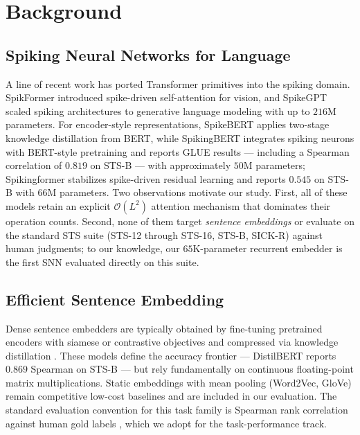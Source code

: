 \documentclass[11pt, conference, compsoc, twoside]{IEEEtran}
\begin{document}
\section{Background}

\subsection{Spiking Neural Networks for Language}
A line of recent work has ported Transformer primitives into the spiking domain. SpikFormer \cite{zhou2023spikformer} introduced spike-driven self-attention for vision, and SpikeGPT \cite{zhu2023spikegpt} scaled spiking architectures to generative language modeling with up to $216$M parameters. For encoder-style representations, SpikeBERT \cite{lv2023spikebert} applies two-stage knowledge distillation from BERT, while SpikingBERT \cite{bal2024spikingbert} integrates spiking neurons with BERT-style pretraining and reports GLUE results --- including a Spearman correlation of $0.819$ on STS-B --- with approximately $50$M parameters; Spikingformer \cite{zhou2025spikingformer} stabilizes spike-driven residual learning and reports $0.545$ on STS-B with $66$M parameters. Two observations motivate our study. First, all of these models retain an explicit $\mathcal{O}(L^2)$ attention mechanism that dominates their operation counts. Second, none of them target \textit{sentence embeddings} or evaluate on the standard STS suite (STS-12 through STS-16, STS-B, SICK-R) against human judgments; to our knowledge, our $65$K-parameter recurrent embedder is the first SNN evaluated directly on this suite.

\subsection{Efficient Sentence Embedding}
Dense sentence embedders are typically obtained by fine-tuning pretrained encoders with siamese \cite{reimers2019sentence} or contrastive \cite{gao2021simcse} objectives and compressed via knowledge distillation \cite{hinton2015distilling, sanh2019distilbert, wang2020minilm}. These models define the accuracy frontier --- DistilBERT reports $0.869$ Spearman on STS-B \cite{sanh2019distilbert} --- but rely fundamentally on continuous floating-point matrix multiplications. Static embeddings with mean pooling (Word2Vec, GloVe) remain competitive low-cost baselines and are included in our evaluation. The standard evaluation convention for this task family is Spearman rank correlation against human gold labels \cite{muennighoff2022mteb, cer2017semeval}, which we adopt for the task-performance track.
\end{document}
